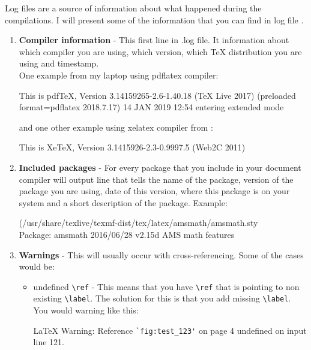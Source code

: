 \documentclass[a4paper,oneside,8pt]{extarticle}
\newcommand{\tex}{\TeX\xspace}
\begin{document}
Log files are a source of information about what happened during the compilations.  I will present some of the information that you can find in log file \cite{understanding_the_log_file}.

\begin{enumerate}
	\item \textbf{Compiler information} - This first line in .log file. It information about which compiler you are using, which version, which \tex distribution you are using and timestamp. \\
          One example from my laptop using pdflatex compiler:\\
            \begin{markdown-block}
                This is pdfTeX, Version 3.14159265-2.6-1.40.18 (TeX Live 2017) (preloaded format=pdflatex 2018.7.17)  14 JAN 2019 12:54
                entering extended mode
            \end{markdown-block}
          and one other example using xelatex compiler from \cite{understanding_the_log_file}:
            \begin{markdown-block}
                This is XeTeX, Version 3.1415926-2.3-0.9997.5 (Web2C 2011)  
            \end{markdown-block}

    \item \textbf{Included packages} - For every package that you include in your document compiler will output line that tells the name of the package, version of the package you are using, date of this version, where this package is on your system and a short description of the package. 
    Example:\\
        \begin{markdown-block}
            (/usr/share/texlive/texmf-dist/tex/latex/amsmath/amsmath.sty\\
            Package: amsmath 2016/06/28 v2.15d AMS math features
        \end{markdown-block}

    \item \textbf{Warnings} - This will usually occur with cross-referencing. Some of the cases would be:
        \begin{itemize}
            \item undefined \verb|\ref| - This means that you have \verb|\ref| that is pointing to non existing \verb|\label|. The solution for this is that you add missing \verb|\label|. \\
                You would warning like this:
                \begin{markdown-block}
                    LaTeX Warning: Reference \verb|`fig:test_123'| on page 4 undefined on input line 121.
                \end{markdown-block}


\end{itemize}
\end{enumerate}
\end{document}

